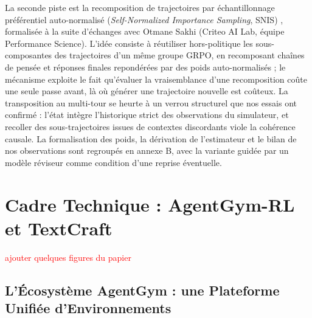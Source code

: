 \documentclass[11pt,a4paper]{article}
\begin{document}
La seconde piste est la recomposition de trajectoires par échantillonnage préférentiel auto-normalisé (\emph{Self-Normalized Importance Sampling}, SNIS) \cite[chap.~9]{owen2013montecarlo}, formalisée à la suite d'échanges avec Otmane Sakhi (Criteo AI Lab, équipe Performance Science). L'idée consiste à réutiliser hors-politique les sous-composantes des trajectoires d'un même groupe GRPO, en recomposant chaînes de pensée et réponses finales repondérées par des poids auto-normalisés ; le mécanisme exploite le fait qu'évaluer la vraisemblance d'une recomposition coûte une seule passe avant, là où générer une trajectoire nouvelle est coûteux. La transposition au multi-tour se heurte à un verrou structurel que nos essais ont confirmé : l'état intègre l'historique strict des observations du simulateur, et recoller des sous-trajectoires issues de contextes discordants viole la cohérence causale. La formalisation des poids, la dérivation de l'estimateur et le bilan de nos observations sont regroupés en annexe B, avec la variante guidée par un modèle réviseur comme condition d'une reprise éventuelle.



















\newpage
\section{Cadre Technique : AgentGym-RL et TextCraft}

\textcolor{red}{ajouter quelques figures du papier}
\subsection{L'Écosystème AgentGym : une Plateforme Unifiée d'Environnements}
\end{document}
